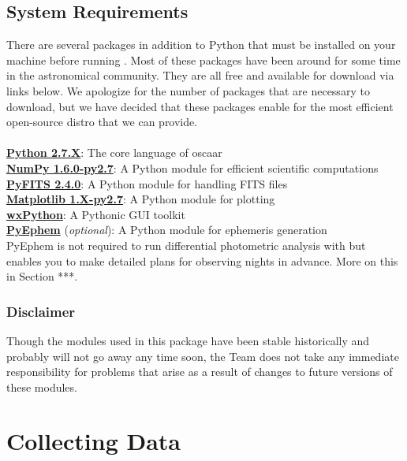 \documentclass{article}
\begin{document}
\subsection{System Requirements} \label{sec:systemRequirements}

There are several packages in addition to Python that must be installed on your machine before running \oscaar. Most of these packages have been around for some time in the astronomical community. They are all free and available for download via links below. We apologize for the number of packages that are necessary to download, but we have decided that these packages enable for the most efficient open-source distro that we can provide.  \\ \\
\noindent
\indent \href{http://www.python.org/getit/}{\textbf{Python 2.7.X}}: The core language of oscaar \\
\indent \href{http://new.scipy.org/download.html}{\textbf{NumPy 1.6.0-py2.7}}: A Python module for efficient scientific computations \\
\indent \href{http://www.stsci.edu/resources/software_hardware/pyfits/}{\textbf{PyFITS 2.4.0}}: A Python module for handling FITS files \\
\indent \href{http://matplotlib.sourceforge.net/index.html}{\textbf{Matplotlib 1.X-py2.7}}: A Python module for plotting\\
\indent \href{http://www.wxpython.org/download.php#stable}{\textbf{wxPython}}: A Pythonic GUI toolkit \\
\indent \href{http://rhodesmill.org/pyephem/}{\textbf{PyEphem}} (\textit{optional}): A Python module for ephemeris generation \\

\noindent
PyEphem is not required to run differential photometric analysis with \oscaar but enables you to make detailed plans for observing nights in advance. More on this in Section ***.%

\subsubsection{Disclaimer}

Though the modules used in this package have been stable historically and probably will not go away any time soon, the \oscaar Team does not take any immediate responsibility for problems that arise as a result of changes to future versions of these modules. 

\section{Collecting Data} \label{sec:collectingData}
\end{document}
